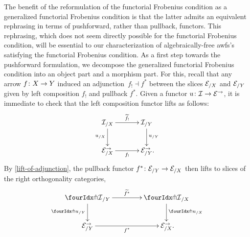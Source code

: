 \documentclass[reqno,10pt,a4paper,oneside,draft]{amsart}
\begin{document}
{{The benefit of the reformulation of the functorial Frobenius condition as a generalized functorial Frobenius condition is that the latter admits an equivalent rephrasing in terms of pushforward, rather than pullback, functors.
This rephrasing, which does not seem directly possible for the functorial Frobenius condition, will be essential to our characterization of algebraically-free awfs's satisfying the functorial Frobenius condition.
As a first step towards the pushforward formulation, we decompose the generalized functorial Frobenius condition into an object part and a morphism part.
For this, recall that any arrow $f \co X \to Y$ induced an adjunction~$f_{!} \dashv f^*$ between the slices $\cal{E}_{/X}$ and $\cal{E}_{/Y}$ given by left composition $f_{!}$ and pullback $f^*$.
Given a functor $u \co \cal{I} \to \catE^\to$, it is immediate to check that the left composition functor lifts as follows:
\[
\xymatrix@C+1em{
  \cal{I}_{/X}
  \ar[r]^-{\widetilde{f_!}}
  \ar[d]_{u_{/X}}
&
  \cal{I}_{/Y}
  \ar[d]^{u_{/Y}}
\\
  \calE_{/X}^\to
  \ar[r]_-{f_!}
&
  \calE_{/Y}^\to
\rlap{.}}
\]
By \cref{lift-of-adjunction}, the pullback functor $f^* \co \catE_{/Y} \to \catE_{/X}$ then lifts to slices of the right orthogonality categories,
\[
\xymatrix@C=1.5cm{
  \liftr{\cal{I}}_{/Y}
  \ar[d]_{{\liftr{u}}_{/Y}}
  \ar[r]^{\widetilde{f^*}}
&
  \liftr{\cal{I}}_{/X}
  \ar[d]^{{\liftr{u}}_{/X}}
\\
  {\catE}_{/Y}^\to
  \ar[r]_{f^*}
&
  \catE_{/X}^\to
\rlap{.}}
\]

}}
\end{document}
